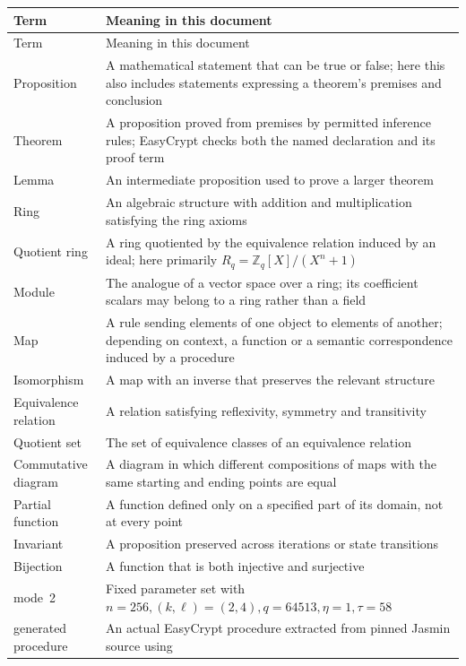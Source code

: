 \begin{longtable}{L{37mm} L{110mm}}
\toprule
Term & Meaning in this document \\
\midrule
\endfirsthead
\toprule
Term & Meaning in this document \\
\midrule
\endhead
Proposition & A mathematical statement that can be true or false; here this
also includes statements expressing a theorem's premises and conclusion \\
Theorem & A proposition proved from premises by permitted inference rules;
EasyCrypt checks both the named declaration and its proof term \\
Lemma & An intermediate proposition used to prove a larger theorem \\
Ring & An algebraic structure with addition and multiplication satisfying
the ring axioms \\
Quotient ring & A ring quotiented by the equivalence relation induced by an
ideal; here primarily \(R_q=\mathbb Z_q[X]/(X^n+1)\) \\
Module & The analogue of a vector space over a ring; its coefficient scalars
may belong to a ring rather than a field \\
Map & A rule sending elements of one object to elements of another; depending
on context, a function or a semantic correspondence induced by a procedure \\
Isomorphism & A map with an inverse that preserves the relevant structure \\
Equivalence relation & A relation satisfying reflexivity, symmetry and transitivity \\
Quotient set & The set of equivalence classes of an equivalence relation \\
Commutative diagram & A diagram in which different compositions of maps with
the same starting and ending points are equal \\
Partial function & A function defined only on a specified part of its domain,
not at every point \\
Invariant & A proposition preserved across iterations or state transitions \\
Bijection & A function that is both injective and surjective \\
mode~2 & Fixed parameter set with \(n=256,(k,\ell)=(2,4),q=64513,\eta=1,\tau=58\) \\
generated procedure & An actual EasyCrypt procedure extracted from pinned
Jasmin source using  \\

\end{longtable}

